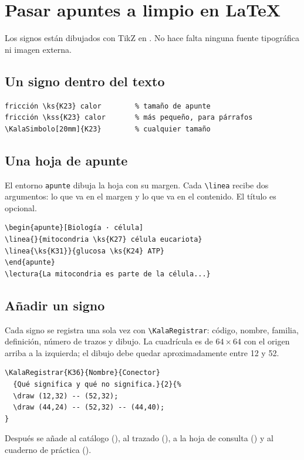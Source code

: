 \section{Pasar apuntes a limpio en LaTeX}\label{sec:latex}

Los signos están dibujados con TikZ en . No hace falta
ninguna fuente tipográfica ni imagen externa.

\subsection{Un signo dentro del texto}
\begin{Verbatim}[fontsize=\small,frame=single]
fricción \ks{K23} calor        % tamaño de apunte
fricción \kss{K23} calor       % más pequeño, para párrafos
\KalaSimbolo[20mm]{K23}        % cualquier tamaño
\end{Verbatim}

\subsection{Una hoja de apunte}
El entorno \texttt{apunte} dibuja la hoja con su margen. Cada \verb|\linea| recibe
dos argumentos: lo que va en el margen y lo que va en el contenido. El título
es opcional.
\begin{Verbatim}[fontsize=\small,frame=single]
\begin{apunte}[Biología · célula]
\linea{}{mitocondria \ks{K27} célula eucariota}
\linea{\ks{K31}}{glucosa \ks{K24} ATP}
\end{apunte}
\lectura{La mitocondria es parte de la célula...}
\end{Verbatim}
\begin{apunte}
\end{apunte}

\subsection{Añadir un signo}
Cada signo se registra una sola vez con \verb|\KalaRegistrar|: código, nombre,
familia, definición, número de trazos y dibujo. La cuadrícula es de
\(64\times64\) con el origen arriba a la izquierda; el dibujo debe quedar
aproximadamente entre 12 y 52.
\begin{Verbatim}[fontsize=\small,frame=single]
\KalaRegistrar{K36}{Nombre}{Conector}
  {Qué significa y qué no significa.}{2}{%
  \draw (12,32) -- (52,32);
  \draw (44,24) -- (52,32) -- (44,40);
}
\end{Verbatim}
Después se añade al catálogo (), al trazado
(), a la hoja de consulta () y al
cuaderno de práctica ().

